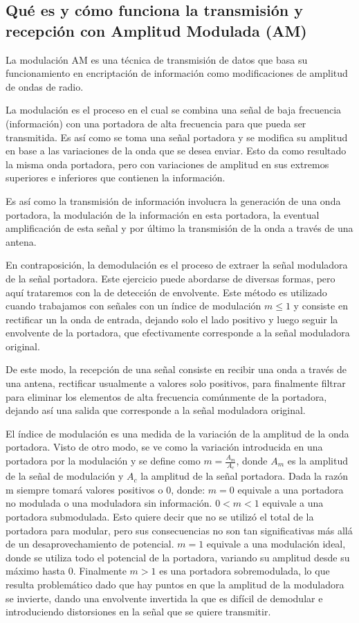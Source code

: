 \subsection{Qué es y cómo funciona la transmisión y recepción con Amplitud Modulada (AM)}
La modulación AM es una técnica de transmisión de datos que basa su funcionamiento en encriptación de información como modificaciones de amplitud de ondas de radio.

La modulación es el proceso en el cual se combina una señal de baja frecuencia (información) con una portadora de alta frecuencia para que pueda ser transmitida. Es así como se toma una señal portadora y se modifica su amplitud en base a las variaciones de la onda que se desea enviar. Esto da como resultado la misma onda portadora, pero con variaciones de amplitud en sus extremos superiores e inferiores que contienen la información.

Es así como la transmisión de información involucra la generación de una onda portadora, la modulación de la información en esta portadora, la eventual amplificación de esta señal y por último la transmisión de la onda a través de una antena.

En contraposición, la demodulación es el proceso de extraer la señal moduladora de la señal portadora. Este ejercicio puede abordarse de diversas formas, pero aquí trataremos con la de detección de envolvente. Este método es utilizado cuando trabajamos con señales con un índice de modulación $m \leq 1$ y consiste en rectificar un la onda de entrada, dejando solo el lado positivo y luego seguir la envolvente de la portadora, que efectivamente corresponde a la señal moduladora original.

De este modo, la recepción de una señal consiste en recibir una onda a través de una antena, rectificar usualmente a valores solo positivos, para finalmente filtrar para eliminar los elementos de alta frecuencia comúnmente de la portadora, dejando así una salida que corresponde a la señal moduladora original.

El índice de modulación es una medida de la variación de la amplitud de la onda portadora. Visto de otro modo, se ve como la variación introducida en una portadora por la modulación y se define como $m = \frac{A_m}{A_c}$, donde $A_m$ es la amplitud de la señal de modulación y $A_c$ la amplitud de la señal portadora. Dada la razón m siempre tomará valores positivos o 0, donde: $m=0$ equivale a una portadora no modulada o una moduladora sin información. $0<m<1$ equivale a una portadora submodulada. Esto quiere decir que no se utilizó el total de la portadora para modular, pero sus consecuencias no son tan significativas más allá de un desaprovechamiento de potencial. $m=1$ equivale a una modulación ideal, donde se utiliza todo el potencial de la portadora, variando su amplitud desde su máximo hasta 0. Finalmente $m>1$ es una portadora sobremodulada, lo que resulta problemático dado que hay puntos en que la amplitud de la moduladora se invierte, dando una envolvente invertida la que es difícil de demodular e introduciendo distorsiones en la señal que se quiere transmitir.

